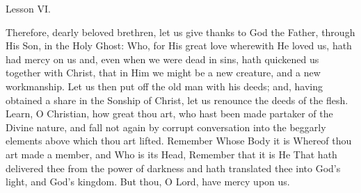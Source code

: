 {  \bigskip{}
  {
    \hfil{Lesson VI.}\hfil

    \begin{parcolumns}[rulebetween,colwidths={1=.43\linewidth}]{2}
    {Therefore, dearly beloved brethren, let us give thanks to God the Father, through His Son, in the Holy Ghost: Who, for His great love wherewith He loved us, hath had mercy on us and, even when we were dead in sins, hath quickened us together with Christ, that in Him we might be a new creature, and a new workmanship. Let us then put off the old man with his deeds; and, having obtained a share in the Sonship of Christ, let us renounce the deeds of the flesh. Learn, O Christian, how great thou art, who hast been made partaker of the Divine nature, and fall not again by corrupt conversation into the beggarly elements above which thou art lifted. Remember Whose Body it is Whereof thou art made a member, and Who is its Head, Remember that it is He That hath delivered thee from the power of darkness and hath translated thee into God's light, and God's kingdom.
      But thou, O Lord, have mercy upon us.}
    \end{parcolumns}

  }

  {
    \bigskip
    \medskip
  }
}